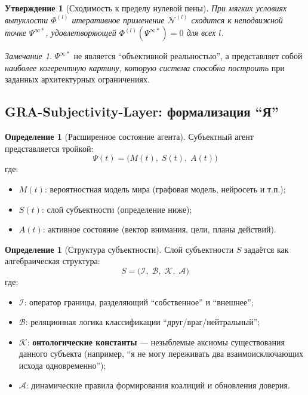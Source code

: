 \documentclass[11pt,a4paper]{article}
\theoremstyle{plain}
\newtheorem{proposition}[theorem]{Утверждение}
\theoremstyle{definition}
\newtheorem{definition}[theorem]{Определение}
\theoremstyle{remark}
\newtheorem{remark}[theorem]{Замечание}
\newcommand{\PsiState}{\Psi}
\newcommand{\Foam}{\Phi}
\newcommand{\NullOp}{\mathcal{N}}
\newcommand{\Mmodel}{M}
\newcommand{\Ssubj}{S}
\newcommand{\Aactive}{A}
\newcommand{\Fcog}{\Foam^{(l)}}
\newcommand{\Identity}{\mathcal{I}}
\newcommand{\Boundaries}{\mathcal{B}}
\newcommand{\Constants}{\mathcal{K}}
\newcommand{\Alliance}{\mathcal{A}}
\begin{document}
\begin{proposition}[Сходимость к пределу нулевой пены]
При мягких условиях выпуклости $\Fcog$ итеративное применение $\NullOp^{(l)}$ сходится к неподвижной точке $\PsiState^{\infty*}$, удовлетворяющей $\Fcog(\PsiState^{\infty*}) = 0$ для всех $l$.
\end{proposition}

\begin{remark}
$\PsiState^{\infty*}$ не является ``объективной реальностью'', а представляет собой \textit{наиболее когерентную картину, которую система способна построить} при заданных архитектурных ограничениях.
\end{remark}

\subsection{GRA-Subjectivity-Layer: формализация ``Я''}

\begin{definition}[Расширенное состояние агента]
Субъектный агент представляется тройкой:
\begin{equation}
    \boxed{\PsiState(t) = \bigl( \Mmodel(t),\; \Ssubj(t),\; \Aactive(t) \bigr)}
    \label{eq:extended-state}
\end{equation}
где:
\begin{itemize}
    \item $\Mmodel(t)$: вероятностная модель мира (графовая модель, нейросеть и т.п.);
    \item $\Ssubj(t)$: слой субъектности (определение ниже);
    \item $\Aactive(t)$: активное состояние (вектор внимания, цели, планы действий).
\end{itemize}
\end{definition}

\begin{definition}[Структура субъектности]
Слой субъектности $\Ssubj$ задаётся как алгебраическая структура:
\begin{equation}
    \boxed{\Ssubj = \bigl( \Identity,\; \Boundaries,\; \Constants,\; \Alliance \bigr)}
    \label{eq:subjectivity}
\end{equation}
где:
\begin{itemize}
    \item $\Identity$: оператор границы, разделяющий ``собственное'' и ``внешнее'';
    \item $\Boundaries$: реляционная логика классификации ``друг/враг/нейтральный'';
    \item $\Constants$: \textbf{онтологические константы} --- незыблемые аксиомы существования данного субъекта (например, ``я не могу переживать два взаимоисключающих исхода одновременно'');
    \item $\Alliance$: динамические правила формирования коалиций и обновления доверия.
\end{itemize}
\end{definition}
\end{document}
